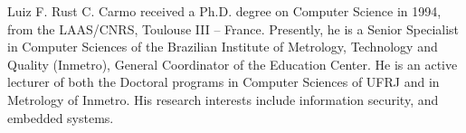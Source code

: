 \documentclass[journal]{IEEEtran}
\begin{document}
\begin{IEEEbiographynophoto}{Luiz F. Rust C. Carmo}
received a Ph.D. degree on Computer Science in 1994, from the LAAS/CNRS, Toulouse III – France.
Presently, he is a Senior Specialist in Computer Sciences of the Brazilian Institute of Metrology, Technology and Quality (Inmetro), General Coordinator of the Education Center. 
He is an active lecturer of both the Doctoral programs in Computer Sciences of UFRJ and in Metrology of Inmetro.
His research interests include information security, and embedded systems.
\end{IEEEbiographynophoto}
\end{document}
